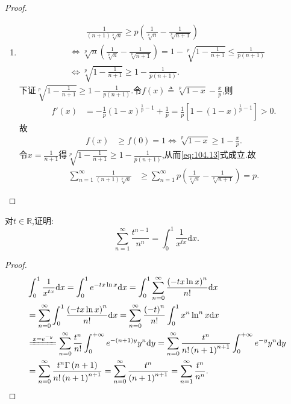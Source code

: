 \documentclass[../../main.tex]{subfiles}%
\begin{document}
\begin{proof}
\begin{enumerate}
\item \begin{align}
&\quad \quad \frac{1}{\left( n+1 \right) \sqrt[p]{n}}\geqslant p\left( \frac{1}{\sqrt[p]{n}}-\frac{1}{\sqrt[p]{n+1}} \right) \label{eq:104.13} \\
&\Longleftrightarrow \sqrt[p]{n}\left( \frac{1}{\sqrt[p]{n}}-\frac{1}{\sqrt[p]{n+1}} \right) =1-\sqrt[p]{1-\frac{1}{n+1}}\leqslant \frac{1}{p\left( n+1 \right)}\nonumber \\
&\Longleftrightarrow \sqrt[p]{1-\frac{1}{n+1}}\geqslant 1-\frac{1}{p\left( n+1 \right)}.\nonumber
\end{align}
下证$\sqrt[p]{1-\frac{1}{n+1}}\geqslant 1-\frac{1}{p\left( n+1 \right)}$.令$f\left( x \right) \triangleq \sqrt[p]{1-x}-\frac{x}{p}$,则
\begin{align*}
f\prime \left( x \right) &=-\frac{1}{p}\left( 1-x \right) ^{\frac{1}{p}-1}+\frac{1}{p}=\frac{1}{p}\left[ 1-\left( 1-x \right) ^{\frac{1}{p}-1} \right] >0.
\end{align*}
故
\begin{align*}
f\left( x \right) &\geqslant f\left( 0 \right) =1\Longleftrightarrow \sqrt[p]{1-x}\geqslant 1-\frac{x}{p}.
\end{align*}
令$x=\frac{1}{n+1}$得$\sqrt[p]{1-\frac{1}{n+1}}\geqslant 1-\frac{1}{p\left( n+1 \right)}$,从而\eqref{eq:104.13}式成立.故
\begin{align*}
\sum_{n=1}^{\infty}{\frac{1}{\left( n+1 \right) \sqrt[p]{n}}}&\geqslant \sum_{n=1}^{\infty}{p\left( \frac{1}{\sqrt[p]{n}}-\frac{1}{\sqrt[p]{n+1}} \right)}=p.
\end{align*}
\end{enumerate}
\end{proof}

\begin{example}
对$t \in \mathbb{R}$,证明:
$$\sum_{n=1}^\infty \frac{t^{n-1}}{n^n}=\int_0^1 \frac{1}{x^{tx}}\mathrm{d}x.$$
\end{example}
\begin{proof}
\begin{align*}
&\int_0^1{\frac{1}{x^{tx}}\mathrm{d}x}=\int_0^1{e^{-tx\ln x}\mathrm{d}x}=\int_0^1{\sum_{n=0}^{\infty}{\frac{\left( -tx\ln x \right) ^n}{n!}\mathrm{d}x}}
\\
&=\sum_{n=0}^{\infty}{\int_0^1{\frac{\left( -tx\ln x \right) ^n}{n!}\mathrm{d}x}}=\sum_{n=0}^{\infty}{\frac{\left( -t \right) ^n}{n!}\int_0^1{x^n\ln ^nx\mathrm{d}x}}
\\
&\xlongequal{x=e^{-y}}\sum_{n=0}^{\infty}{\frac{t^n}{n!}\int_0^{+\infty}{e^{-\left( n+1 \right) y}y^n\mathrm{d}y}}=\sum_{n=0}^{\infty}{\frac{t^n}{n!\left( n+1 \right) ^{n+1}}\int_0^{+\infty}{e^{-y}y^n\mathrm{d}y}}
\\
&=\sum_{n=0}^{\infty}{\frac{t^n\Gamma \left( n+1 \right)}{n!\left( n+1 \right) ^{n+1}}}=\sum_{n=0}^{\infty}{\frac{t^n}{\left( n+1 \right) ^{n+1}}}=\sum_{n=1}^{\infty}{\frac{t^n}{n^n}}.
\end{align*}
\end{proof}
\end{document}
